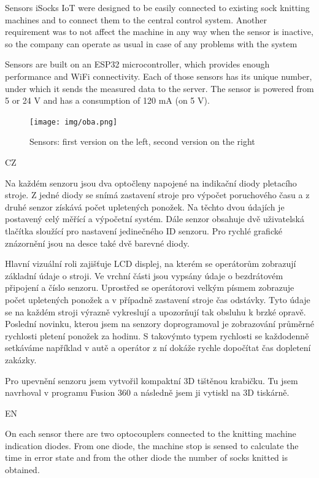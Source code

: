 \documentclass[12pt, a4paper]{article}
\begin{document}
Sensors iSocks IoT were designed to be easily connected to existing sock knitting machines and to connect them to the central control system.
Another requirement was to not affect the machine in any way when the sensor is inactive, so the company can operate as usual in case of any problems with the system

Sensors are built on an ESP32 microcontroller, which provides enough performance and WiFi connectivity.
Each of those sensors has its unique number, under which it sends the measured data to the server.
The sensor is powered from 5 or 24 V and has a consumption of 120 mA (on 5 V).

\begin{figure}[t]
    \centering
    \texttt{[image: img/oba.png]}
    \caption{Sensors: first version on the left, second version on the right}
    \label{fig:dveVerze}
\end{figure}

CZ

Na každém senzoru jsou dva optočleny napojené na indikační diody pletacího stroje.
Z jedné diody se snímá zastavení stroje pro výpočet poruchového času a z druhé senzor získává počet upletených ponožek.
Na těchto dvou údajích je postavený celý měřící a výpočetní systém.
Dále senzor obsahuje dvě uživatelská tlačítka sloužící pro nastavení jedinečného ID senzoru.
Pro rychlé grafické znázornění jsou na desce také dvě barevné diody.

Hlavní vizuální roli zajišťuje LCD displej, na kterém se operátorům zobrazují základní údaje o stroji.
Ve vrchní části jsou vypsány údaje o bezdrátovém připojení a číslo senzoru.
Uprostřed se operátorovi velkým písmem zobrazuje počet upletených ponožek a v případně zastavení stroje čas odstávky.
Tyto údaje se na každém stroji výrazně vykreslují a upozorňují tak obsluhu k brzké opravě.
Poslední novinku, kterou jsem na senzory doprogramoval je zobrazování průměrné rychlosti pletení ponožek za hodinu.
S takovýmto typem rychlosti se každodenně setkáváme například v autě a operátor z ní dokáže rychle dopočítat čas dopletení zakázky.

Pro upevnění senzoru jsem vytvořil kompaktní 3D tištěnou krabičku.
Tu jsem navrhoval v programu Fusion 360 a následně jsem ji vytiskl na 3D tiskárně.

EN

On each sensor there are two optocouplers connected to the knitting machine indication diodes.
From one diode, the machine stop is sensed to calculate the time in error state and from the other diode the number of socks knitted is obtained.
\end{document}
